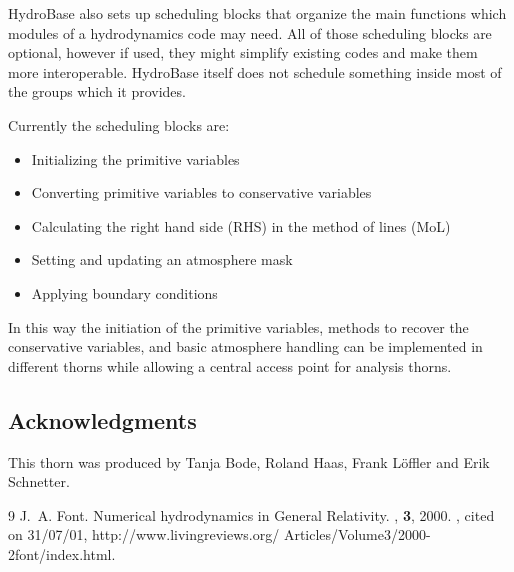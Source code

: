 HydroBase also sets up scheduling blocks that organize the main functions which modules of a 
hydrodynamics code may need. All of those scheduling blocks are optional, however if used,
they might simplify existing codes and make them more interoperable. HydroBase itself does
not schedule something inside most of the groups which it provides.

Currently the scheduling blocks are:
\begin{itemize}
 \item Initializing the primitive variables
 \item Converting primitive variables to conservative variables
 \item Calculating the right hand side (RHS) in the method of lines (MoL)
 \item Setting and updating an atmosphere mask
 \item Applying boundary conditions
\end{itemize}

In this way the initiation of the primitive variables, methods to recover the conservative
variables, and basic atmosphere handling can be implemented in different thorns while allowing
a central access point for analysis thorns.

\subsection{Acknowledgments}

This thorn was produced by Tanja Bode, Roland Haas, Frank Löffler and Erik Schnetter.

\begin{thebibliography}{9}
    J.~A. Font.
    \newblock Numerical hydrodynamics in {G}eneral {R}elativity.
    , {\bf 3}, 2000.
    , cited on 31/07/01,
      http://www.livingreviews.org/ Articles/Volume3/2000-2font/index.html.

\end{thebibliography}



